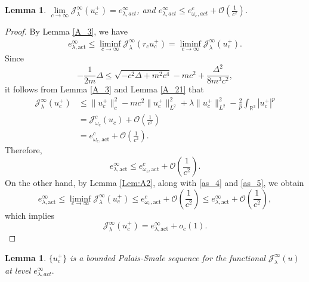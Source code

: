 \documentclass{amsart}
\theoremstyle{plain}
\newtheorem{lemma}[theorem]{Lemma}
\theoremstyle{definition}
\theoremstyle{remark}
\numberwithin{equation}{section} \numberwithin{figure}{section}
\begin{document}
\begin{lemma}\label{rem_stb5}
    $\lim\limits_{c\to \infty}\mathcal{J}^\infty_\lambda(u_c^+)=e_{\lambda, act}^\infty$, and $e_{\lambda, act}^\infty\leq e_{\omega_c, act}^c+ \mathcal{O}\left(\frac{1}{c^2}\right)$.
\end{lemma}
\begin{proof}
  By Lemma \ref{A_3}, we have
  \begin{equation}\label{as_4}
      \begin{split}
          e_{\lambda, \text{act}}^\infty \leq \liminf_{c \to \infty} \mathcal{J}^\infty_\lambda(r_c u_c^+)
          = \liminf_{c \to \infty} \mathcal{J}^\infty_\lambda(u_c^+).
      \end{split}
  \end{equation}
  Since
  \begin{equation}\label{as_7}
      -\frac{1}{2m} \Delta \leq \sqrt{-c^2 \Delta + m^2 c^4} - m c^2 + \frac{\Delta^2}{8m^3 c^2},
  \end{equation}
  it follows from Lemma \ref{A_3} and Lemma \ref{A_21} that
  \begin{equation}\label{as_5}
      \begin{split}
          \mathcal{J}^\infty_\lambda(u_c^+) 
          &\leq \|u_c^+\|_c^2 - m c^2 \|u_c^+\|_{L^2}^2 + \lambda \|u_c^+\|_{L^2}^2 - \frac{2}{p} \int_{\mathbb{R}^3} |u_c^+|^p \\
          &= \mathcal{J}^c_{\omega_c}(u_c) + \mathcal{O}\left(\frac{1}{c^2}\right) \\
          &= e_{\omega_c, \text{act}}^c + \mathcal{O}\left(\frac{1}{c^2}\right).
      \end{split}
  \end{equation}
  Therefore,
  \[
      e_{\lambda, \text{act}}^\infty \leq e_{\omega_c, \text{act}}^c + \mathcal{O}\left(\frac{1}{c^2}\right).
  \]
  On the other hand, by Lemma \ref{Lem:A2}, along with \eqref{as_4} and \eqref{as_5}, we obtain
  \[
      e_{\lambda, \text{act}}^\infty \leq \liminf_{c \to \infty} \mathcal{J}^\infty_\lambda(u_c^+)
      \leq e_{\omega_c, \text{act}}^c + \mathcal{O}\left(\frac{1}{c^2}\right)
      \leq e_{\lambda, \text{act}}^\infty + \mathcal{O}\left(\frac{1}{c^2}\right),
  \]
  which implies
  \[
      \mathcal{J}^\infty_\lambda(u_c^+) = e_{\lambda, \text{act}}^\infty + o_c(1).
  \]
\end{proof}


\begin{lemma}\label{Lem:A8}
	$\{u_c^+\}$ is a bounded Palais-Smale sequence for the functional
	$\mathcal{J}^\infty_\lambda(u)$ at level $e_{\lambda, act}^\infty.$
\end{lemma}
\end{document}
